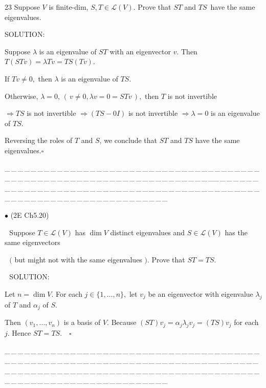 \documentclass[a4paper, 11pt, UTF8]{article}
\def\Lm{\mathcal{L}}
\begin{document}
\begin{large}
{\timesbf\Large 23} {\timessl\Large 
Suppose $V$ is finite-dim, $S, T\in\Lm(V)$. Prove that $ST$ and $TS$\, have the same eigenvalues.}\par
{\timesbf S\footnotesize{OLUTION:}}\par\quad
Suppose $\lambda$ is an eigenvalue of $ST$ with an eigenvector $v.$ Then $T(STv)=\lambda Tv=TS(Tv).$\par\quad
If $Tv\neq 0,$ then $\lambda$ is an eigenvalue of $TS.$\par\quad
Otherwise, $\lambda=0,\,(\,v\neq 0,\lambda v=0=STv\,),$ then $T$ is not invertible\par\qquad\qquad
 $\Rightarrow TS$ is not invertible $\Rightarrow (TS-0I)$ is not invertible $\Rightarrow \lambda=0$ is an eigenvalue of $TS.$\par\quad
Reversing the roles of $T$ and $S$, we conclude that $ST$ and $TS$ have the same eigenvalues.\quad$\square$\par
{\tiny \_\,\_\,\_\,\_\,\_\,\_\,\_\,\_\,\_\,\_\,\_\,\_\,\_\,\_\,\_\,\_\,\_\,\_\,\_\,\_\,\_\,\_\,\_\,\_\,\_\,\_\,\_\,\_\,\_\,\_\,\_\,\_\,\_\,\_\,\_\,\_\,\_\,\_\,\_\,\_\,\_\,\_\,\_\,\_\,\_\,\_\,\_\,\_\,\_\,\_\,\_\,\_\,\_\,\_\,\_\,\_\,\_\,\_\,\_\,\_\,\_\,\_\,\_\,\_\,\_\,\_\,\_\,\_\,\_\,\_\,\_\_\,\_\,\_\,\_\,\_\,\_\,\_\,\_\,\_\,\_\,\_\,\_\,\_\,\_\,\_\,\_\,\_\,\_\,\_\,\_\,\_\,\_\,\_\,\_\,\_\,\_\,\_\,\_\,\_\,\_\,\_\,\_\,\_\,\_\,\_\,\_\,\_\,\_\,\_\,\_\,\_\,\_\,\_\,\_\,\_\,\_\,\_\,\_\,\_\,\_\,\_\,\_\,\_\,\_\,\_\,\_\,\_\,\_\,\_\,\_\,\_\,\_\,\_\,\_\,\_\,\_\,\_\,\_\,\_\,\_\,\_}\par

{\small $\bullet$} ({\normalsize 2E Ch5.20})\par\,\,
{\timessl\Large 
Suppose $T\in\Lm(V)$ has $\dim V$ distinct eigenvalues and $S\in\Lm(V)$ has the same eigenvectors}\par\,\,
{\timessl\Large $($ but might not with the same eigenvalues $)$. Prove that $ST=TS.$}\par\,\,
{\timesbf S\footnotesize{OLUTION:}}\par\quad
Let $n=\dim V.$ For each $j\in\{1,\dots,n\},$ let $v_j$ be an eigenvector with eigenvalue $\lambda_j$ of $T$ and $\alpha_j$ of $S$.\par\quad
Then $(v_1,\dots,v_n)$ is a basis of $V.$ Because $(ST)v_j=\alpha_j\lambda_j v_j=(TS)v_j$ for each $j.$ Hence $ST=TS.\quad\square$\par
{\tiny \_\,\_\,\_\,\_\,\_\,\_\,\_\,\_\,\_\,\_\,\_\,\_\,\_\,\_\,\_\,\_\,\_\,\_\,\_\,\_\,\_\,\_\,\_\,\_\,\_\,\_\,\_\,\_\,\_\,\_\,\_\,\_\,\_\,\_\,\_\,\_\,\_\,\_\,\_\,\_\,\_\,\_\,\_\,\_\,\_\,\_\,\_\,\_\,\_\,\_\,\_\,\_\,\_\,\_\,\_\,\_\,\_\,\_\,\_\,\_\,\_\,\_\,\_\,\_\,\_\,\_\,\_\,\_\,\_\,\_\,\_\_\,\_\,\_\,\_\,\_\,\_\,\_\,\_\,\_\,\_\,\_\,\_\,\_\,\_\,\_\,\_\,\_\,\_\,\_\,\_\,\_\,\_\,\_\,\_\,\_\,\_\,\_\,\_\,\_\,\_\,\_\,\_\,\_\,\_\,\_\,\_\,\_\,\_\,\_\,\_\,\_\,\_\,\_\,\_\,\_\,\_\,\_\,\_\,\_\,\_\,\_\,\_\,\_\,\_\,\_\,\_\,\_\,\_\,\_\,\_\,\_\,\_\,\_\,\_\,\_\,\_\,\_\,\_\,\_\,\_\,\_}\par



\end{large}
\end{document}
